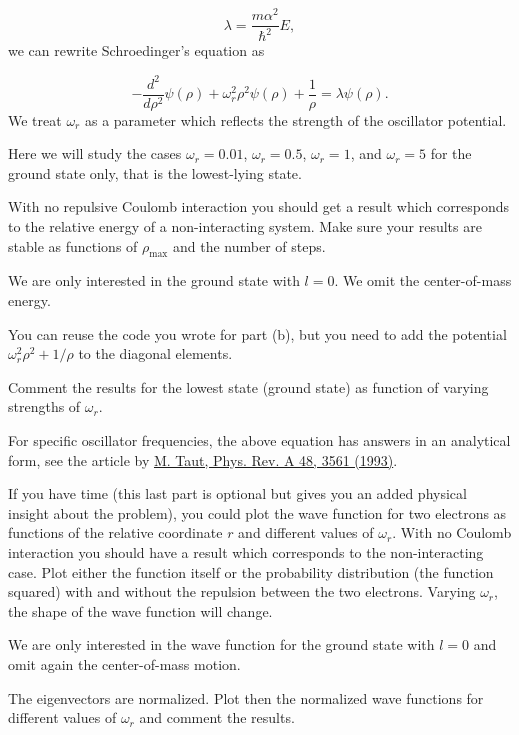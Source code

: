 \documentclass[%
oneside,                 %
final,                   %
10pt]{article}
\begin{document}
\begin{equation*}
\lambda = \frac{m\alpha^2}{\hbar^2}E,
\end{equation*}
we can rewrite Schroedinger's equation as

\begin{equation*}
  -\frac{d^2}{d\rho^2} \psi(\rho) + \omega_r^2\rho^2\psi(\rho) +\frac{1}{\rho} = \lambda \psi(\rho).
\end{equation*}
We treat $\omega_r$ as a parameter which reflects the strength of the oscillator potential.

Here we will study the cases $\omega_r = 0.01$, $\omega_r = 0.5$, $\omega_r =1$,
and $\omega_r = 5$   
for the ground state only, that is the lowest-lying state.


With no repulsive Coulomb interaction 
you should get a result which corresponds to 
the relative energy of a non-interacting system.   
Make sure your results are 
stable as functions of $\rho_{\mathrm{max}}$ and the number of steps.

We are only interested in the ground state with $l=0$. We omit the 
center-of-mass energy.

You can reuse the code you wrote for part (b), 
but you need to add  the potential $\omega_r^2\rho^2+1/\rho$ to the diagonal elements. 

Comment the results for the lowest state (ground state) as function of
varying strengths of $\omega_r$. 


For specific oscillator frequencies, the above equation has answers in an analytical form,
see the article by \href{{http://prola.aps.org/abstract/PRA/v48/i5/p3561_1}}{M. Taut, Phys. Rev. A 48, 3561 (1993)}.

If you have time (this last part is optional but gives you an added physical insight about the problem), you could plot the wave function 
for two electrons as functions of the relative coordinate $r$ and different
values of $\omega_r$.  With no Coulomb interaction you should have a result which corresponds to the non-interacting case. 
Plot either the function itself or the probability distribution (the function squared) with and without the repulsion between the two electrons.
Varying $\omega_r$, the shape of the wave function
will change.  

We are only interested in the wave function for the ground state with $l=0$ and
omit again the  center-of-mass motion.

The eigenvectors are normalized. 
Plot then the normalized wave functions for different  values of $\omega_r$ and comment the results.
\end{document}
